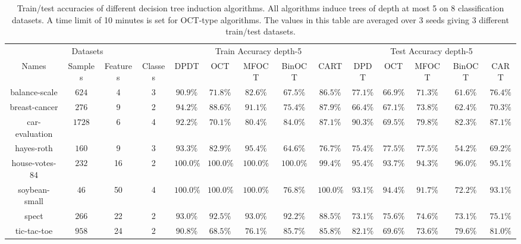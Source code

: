 \begin{table}
    \centering
    \footnotesize
    \caption{Train/test accuracies of different decision tree induction algorithms. All algorithms induce trees of depth at most 5 on 8 classification datasets. A time limit of 10 minutes is set for OCT-type algorithms. The values in this table are averaged over 3 seeds giving 3 different train/test datasets. %
    }
    \begin{tabular}{|c|ccc|ccccc|ccccc|}
    \hline \multicolumn{4}{|c}{ Datasets } & \multicolumn{5}{|c|}{ Train Accuracy depth-5}& \multicolumn{5}{c|}{ Test Accuracy depth-5} \\
    Names & Samples & Features & Classes & DPDT & OCT & MFOCT & BinOCT & CART & DPDT & OCT & MFOCT & BinOCT & CART \\
    \hline 
    balance-scale & $624$ & 4 & 3 & $ 90.9 \%$ & $ 71.8 \%$ & $ 82.6 \%$ & $ 67.5 \%$ & $ 86.5 \%$ & $ 77.1 \%$ & $ 66.9 \%$ & $ 71.3 \%$ & $ 61.6 \%$ & $ 76.4 \%$  \\
    breast-cancer & $276$ & 9 & 2 & $ 94.2 \%$ & $ 88.6 \%$ & $ 91.1 \%$ & $ 75.4 \%$ & $ 87.9 \%$ & $ 66.4 \%$ & $ 67.1 \%$ & $ 73.8 \%$ & $ 62.4 \%$ & $ 70.3 \%$ \\
    car-evaluation & $1728$ & 6 & 4 & $ 92.2 \%$  & $ 70.1 \%$ & $ 80.4 \%$ & $ 84.0 \%$ & $ 87.1 \%$ & $ 90.3 \%$  &$ 69.5 \%$ & $ 79.8 \%$ & $ 82.3 \%$ & $ 87.1 \%$ \\
    hayes-roth & $160$ & 9 & 3 & $ 93.3 \%$  & $ 82.9 \%$ & $ 95.4 \%$ & $ 64.6 \%$ & $ 76.7 \%$ & $ 75.4 \%$ &$ 77.5 \%$ & $ 77.5 \%$ & $ 54.2 \%$ & $ 69.2 \%$ \\
    house-votes-84 & $232$ & 16 & 2 & $ 100.0 \%$ & $ 100.0 \%$ & $ 100.0 \%$ & $ 100.0 \%$ & $ 99.4 \%$ & $ 95.4 \%$ &$ 93.7 \%$ & $ 94.3 \%$ & $ 96.0 \%$ & $ 95.1 \%$\\
    soybean-small & $46$ & 50 & 4 & $ 100.0 \%$  & $ 100.0 \%$ & $ 100.0 \%$ & $ 76.8 \%$ & $ 100.0 \%$ & $ 93.1 \%$ &$ 94.4 \%$ & $ 91.7 \%$ & $ 72.2 \%$ & $ 93.1 \%$ \\
    spect & $266$ & 22 & 2 & $ 93.0 \%$ & $ 92.5 \%$ & $ 93.0 \%$ & $ 92.2 \%$ & $ 88.5 \%$ & $ 73.1 \%$ &$ 75.6 \%$ & $ 74.6 \%$ & $ 73.1 \%$ & $ 75.1 \%$\\
    tic-tac-toe & $958$ & 24 & 2 & $ 90.8 \%$ & $ 68.5 \%$ & $ 76.1 \%$ & $ 85.7 \%$ & $ 85.8 \%$ & $ 82.1 \%$  &$ 69.6 \%$ & $ 73.6 \%$ & $ 79.6 \%$ & $ 81.0 \%$\\
    \hline
    \end{tabular}
    \label{tab:more-res}
\end{table}

